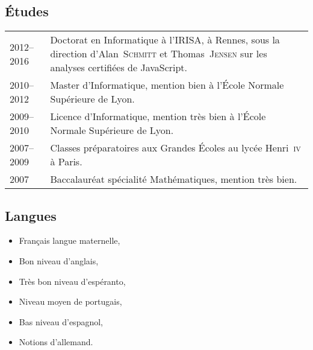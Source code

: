 \documentclass[12pt,a4paper]{article}
\makeatletter
\newenvironment{datecvsection}[1]%
               {\subsection*{#1}%
                 \noindent \begin{tabular}{@{}p{\annee}p{\texte}@{}}}
               {\end{tabular}}
\newenvironment{itemcvsection}[1]%
               {\subsection*{#1}\begin{itemize}}
               {\end{itemize}}
\newcommand\familyName{\textsc}
\newcommand\placeName{}
\makeatother
\begin{document}
\begin{datecvsection}{Études}

    2012–2016 & Doctorat en Informatique à l’\placeName{IRISA}, à \placeName{Rennes}, sous la direction d’Alan~\familyName{Schmitt} et Thomas~\familyName{Jensen} sur les analyses certifiées de JavaScript. \\

	2010–2012 & Master d’Informatique, mention bien à l’École Normale Supérieure de \placeName{Lyon}. \\

	2009–2010 & Licence d’Informatique, mention très bien à l’École Normale Supérieure de \placeName{Lyon}. \\

    2007–2009 & Classes préparatoires aux Grandes Écoles au lycée \placeName{Henri~\textsc{iv}} à \placeName{Paris}. \\

	2007 & Baccalauréat spécialité Mathématiques, mention très bien. \\

\end{datecvsection}

\begin{itemcvsection}{Langues}

   \item Français langue maternelle,
   \item Bon niveau d’anglais,
   \item Très bon niveau d’espéranto,
   \item Niveau moyen de portugais,
   \item Bas niveau d’espagnol,
   \item Notions d’allemand.

\end{itemcvsection}
\end{document}

